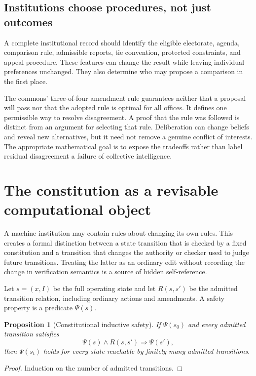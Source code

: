\documentclass[11pt,letterpaper]{article}
\theoremstyle{plain}
\newtheorem{proposition}{Proposition}[section]
\theoremstyle{definition}
\theoremstyle{remark}
\begin{document}
\subsection{Institutions choose procedures, not just outcomes}
A complete institutional record should identify the eligible electorate, agenda, comparison rule, admissible reports, tie convention, protected constraints, and appeal procedure. These features can change the result while leaving individual preferences unchanged. They also determine who may propose a comparison in the first place.

The commons' three-of-four amendment rule guarantees neither that a proposal will pass nor that the adopted rule is optimal for all offices. It defines one permissible way to resolve disagreement. A proof that the rule was followed is distinct from an argument for selecting that rule. Deliberation can change beliefs and reveal new alternatives, but it need not remove a genuine conflict of interests. The appropriate mathematical goal is to expose the tradeoffs rather than label residual disagreement a failure of collective intelligence.

\section{The constitution as a revisable computational object}\label{sec:constitution}

A machine institution may contain rules about changing its own rules. This creates a formal distinction between a state transition that is checked by a fixed constitution and a transition that changes the authority or checker used to judge future transitions. Treating the latter as an ordinary edit without recording the change in verification semantics is a source of hidden self-reference.

Let $s=(x,I)$ be the full operating state and let $R(s,s')$ be the admitted transition relation, including ordinary actions and amendments. A safety property is a predicate $\Psi(s)$.

\begin{proposition}[Constitutional inductive safety]\label{prop:safety}
If $\Psi(s_0)$ and every admitted transition satisfies
\[
\Psi(s)\wedge R(s,s')\Longrightarrow\Psi(s'),
\]
then $\Psi(s_t)$ holds for every state reachable by finitely many admitted transitions.
\end{proposition}
\begin{proof}
Induction on the number of admitted transitions.
\end{proof}
\end{document}
